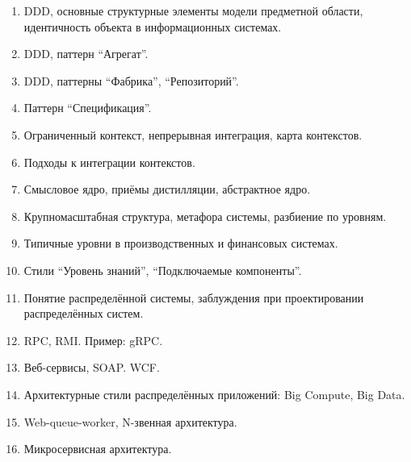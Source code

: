 \documentclass[a5paper]{article}
\begin{document}
\begin{enumerate}
    \item DDD, основные структурные элементы модели предметной области, идентичность объекта в информационных системах.
    \item DDD, паттерн \enquote{Агрегат}.
    \item DDD, паттерны \enquote{Фабрика}, \enquote{Репозиторий}.
    \item Паттерн \enquote{Спецификация}.
    \item Ограниченный контекст, непрерывная интеграция, карта контекстов.
    \item Подходы к интеграции контекстов.
    \item Смысловое ядро, приёмы дистилляции, абстрактное ядро.
    \item Крупномасштабная структура, метафора системы, разбиение по уровням. 
    \item Типичные уровни в производственных и финансовых системах.
    \item Стили \enquote{Уровень знаний}, \enquote{Подключаемые компоненты}.
    \item Понятие распределённой системы, заблуждения при проектировании распределённых систем.
    \item RPC, RMI. Пример: gRPC.
    \item Веб-сервисы, SOAP. WCF.
    \item Архитектурные стили распределённых приложений: Big Compute, Big Data.
    \item Web-queue-worker, N-звенная архитектура.
    \item Микросервисная архитектура.
\end{enumerate}
\end{document}
